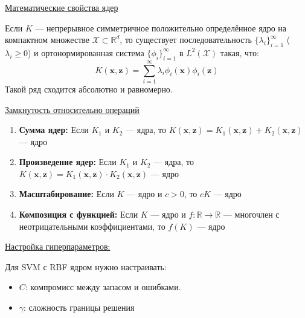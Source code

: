 \underline{Математические свойства ядер}

\begin{theorem}
    Если $K$ --- непрерывное симметричное положительно определённое ядро на компактном множестве $\mathcal{X}
    \subset \mathbb{R}^d$, то существует последовательность $\{\lambda_i\}_{i=1}^\infty$ ($\lambda_i \geq 0$) и
    ортонормированная система $\{\phi_i\}_{i=1}^\infty$ в $L^2(\mathcal{X})$ такая, что:
    \[ K(\bm{x}, \bm{z}) = \sum_{i=1}^\infty \lambda_i \phi_i(\bm{x}) \phi_i(\bm{z}) \]
    Такой ряд сходится абсолютно и равномерно.
\end{theorem}

\underline{Замкнутость относительно операций}

\begin{enumerate}
    \item \textbf{Сумма ядер:} Если $K_1$ и $K_2$ --- ядра, то $K(\bm{x}, \bm{z}) = K_1(\bm{x}, \bm{z}) +
    K_2(\bm{x}, \bm{z})$ --- ядро
    \item \textbf{Произведение ядер:} Если $K_1$ и $K_2$ --- ядра, то $K(\bm{x}, \bm{z}) = K_1(\bm{x}, \bm{z})
    \cdot K_2(\bm{x}, \bm{z})$ --- ядро
    \item \textbf{Масштабирование:} Если $K$ --- ядро и $c > 0$, то $cK$ --- ядро
    \item \textbf{Композиция с функцией:} Если $K$ --- ядро и $f: \mathbb{R} \to \mathbb{R}$ --- многочлен с
    неотрицательными коэффициентами, то $f(K)$ --- ядро
\end{enumerate}

\underline{Настройка гиперпараметров:}

Для SVM с RBF ядром нужно настраивать:
\begin{itemize}
    \item $C$: компромисс между запасом и ошибками.
    \item $\gamma$: сложность границы решения
\end{itemize}
